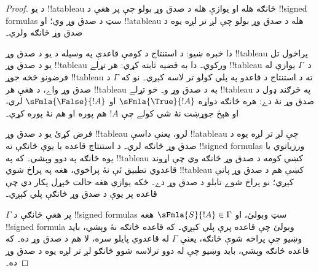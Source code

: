 \documentclass[../../../include/open-logic-section]{subfiles}
\begin{document}
\begin{proof}
د يو !!a{tableau} څانګه هله او يوازې هله د صدق وړ بولو چې پر هغې
د !!{signed formula}s سټ د صدق وړ وي؛ او !!a{tableau} هله د صدق وړ
بولو چې لږ تر لږه يوه د صدق وړ څانګه ولري۔

دا خبره ښيو: د استنتاج د کومې قاعدې په وسيله د يو د صدق وړ
!!{tableau} پراخول تل يو د صدق وړ !!{tableau} ورکوي۔ دا به قضيه
ثابته کړي: هر تړلے !!{tableau} د~$\Gamma$ يوازې له فرضونو څخه جوړ
!!{tableau} ته د استنتاج د قاعدو په پلي کولو تر لاسه کېږي۔ نو که
$\Gamma$ د صدق وړ واے، د هغې هر !!{tableau} به د صدق وړ و۔ خو تړلے
!!{tableau} په څرګند ډول د صدق وړ نۀ دے: هره څانګه دواړه
$\sFmla{\True}{!A}$ او $\sFmla{\False}{!A}$ لري، او هېڅ جوړښت
نۀ شي کولے چې $!A$ هم پوره او هم نۀ پوره کړي۔

فرض کړئ يو د صدق وړ !!{tableau} لرو، يعنې داسې !!a{tableau} چې لږ
تر لږه يوه د صدق وړ څانګه لري۔ د استنتاج قاعده يا يوې څانګې ته
!!{signed formula}s ورزياتوي يا يوه څانګه په دوو وېشي۔ که په
!!{tableau} کښې کومه د صدق وړ څانګه وي چې اړوند قاعدوي تطبيق ئې نۀ
پراخوي، هغه په پراخ شوي !!{tableau} کښې هم د صدق وړ پاتې کېږي؛ نو
پراخ شوے تابلو د صدق وړ دے۔ ځکه يوازې هغه حالت څېړل پکار دي چې
قاعده پر يوې د صدق وړ څانګې پلي کېږي۔

$\Gamma$ پر هغې څانګې د !!{signed formula}s سټ وبولئ، او
$\sFmla{S}{!A} \in \Gamma$ هغه !!{signed formula} وبولئ چې قاعده
پرې پلي کېږي۔ که قاعده څانګه نۀ وېشي، بايد وښيو چې پراخه شوې څانګه،
يعنې $\Gamma$ له قاعدوي پايلو سره، لا هم د صدق وړ ده۔ که قاعده
څانګه وېشي، بايد وښيو چې له دوو ترلاسه شوو څانګو لږ تر لږه يوه د
صدق وړ ده۔
  

\end{proof}
\end{document}

